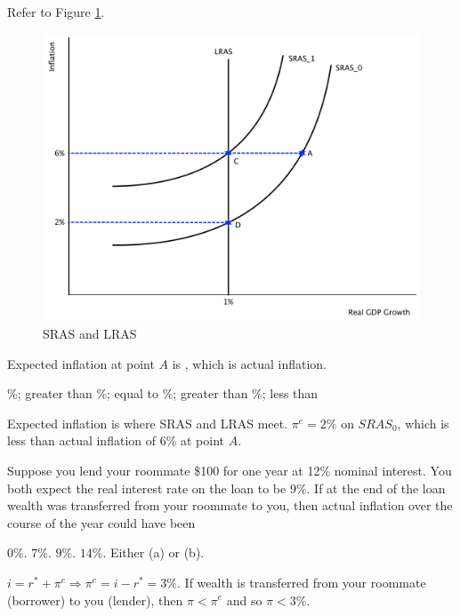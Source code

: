 \documentclass[addpoints,11pt]{exam}
\theoremstyle{definition}
\newcommand{\blank}[0]{\underline{\hspace{3cm}}}
\begin{document}
\begin{questions}
\question Refer to Figure \ref{fig5}.

\begin{figure}[h!]
	\centering
	\includegraphics[scale=.40]{final_32.pdf}
	\caption{SRAS and LRAS}
	\label{fig5}
\end{figure}

Expected inflation at point $A$ is \blank, which is \blank actual inflation.

\begin{choices}
\%; greater than
\%; equal to
\%; greater than
\%; less than
\end{choices}

\begin{solution}
Expected inflation is where SRAS and LRAS meet. $\pi^e = 2\%$ on $SRAS_0$, which is less than actual inflation of 6\% at point $A$.
\end{solution}

\question Suppose you lend your roommate \$100 for one year at 12\% nominal interest. You both expect the real interest rate on the loan to be 9\%. If at the end of the loan wealth was transferred from your roommate to you, then actual inflation over the course of the year could have been
	
\begin{choices}
		\CorrectChoice $0\%$.
		\choice $7\%$.
		\choice $9\%$.
		\choice $14\%$.
		\choice Either (a) or (b).
\end{choices}
	
\begin{solution}
$i = r^*  + \pi^e \Rightarrow \pi^e = i - r^* = 3\%$. If wealth is transferred from your roommate (borrower) to you (lender), then $\pi < \pi^e$ and so $\pi < 3\%$.
\end{solution}


\end{questions}
\end{document}
